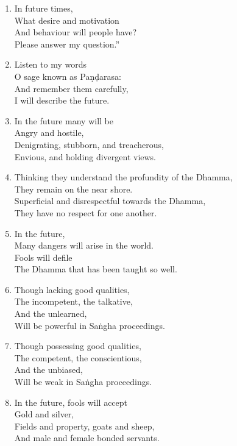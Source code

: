\documentclass[10pt, openany]{book}
\newcommand*{\vleftofline}[1]{\leavevmode\llap{#1}}
\begin{document}
\begin{enumerate}
\item \vleftofline{“}In future times,\\
What desire and motivation\\
And behaviour will people have?\\
Please answer my question.”

\item \vleftofline{“}Listen to my words\\
O sage known as Paṇḍarasa:\\
And remember them carefully,\\
I will describe the future.

\item In the future many will be\\
Angry and hostile,\\
Denigrating, stubborn, and treacherous,\\
Envious, and holding divergent views.

\item Thinking they understand the profundity of the Dhamma,\\
They remain on the near shore.\\
Superficial and disrespectful towards the Dhamma,\\
They have no respect for one another.

\item In the future,\\
Many dangers will arise in the world.\\
Fools will defile\\
The Dhamma that has been taught so well.

\item Though lacking good qualities,\\
The incompetent, the talkative,\\
And the unlearned,\\
Will be powerful in Saṅgha proceedings.

\item Though possessing good qualities,\\
The competent, the conscientious,\\
And the unbiased,\\
Will be weak in Saṅgha proceedings.

\item In the future, fools will accept\\
Gold and silver,\\
Fields and property, goats and sheep,\\
And male and female bonded servants.


\end{enumerate}
\end{document}
